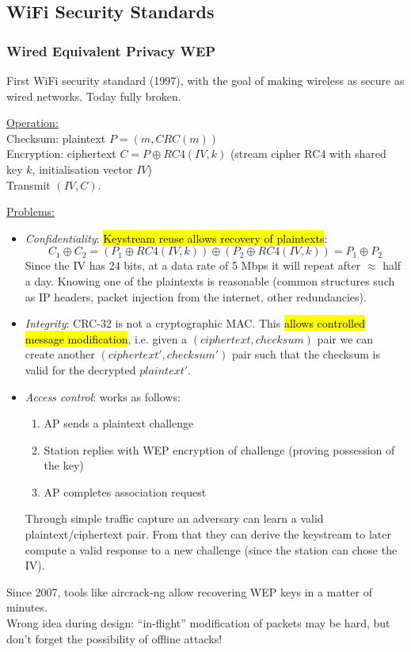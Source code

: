 \subsection{WiFi Security Standards}

\subsubsection*{Wired Equivalent Privacy WEP}

First WiFi security standard (1997), with the goal of making wireless as secure as wired networks.
Today fully broken.

\underline{Operation:}\\
Checksum: plaintext $P = (m, CRC(m))$ \\
Encryption: ciphertext $C = P \oplus RC4(IV, k)$ (stream cipher RC4 with shared key $k$, initialisation vector $IV$) \\
Transmit $(IV, C)$.

\underline{Problems:}
\begin{itemize}
	\item \textit{Confidentiality}:
	      \hl{Keystream reuse allows recovery of plaintexts}:
	      $$ C_1 \oplus C_2 = (P_1 \oplus RC4(IV,k)) \oplus (P_2 \oplus RC4(IV,k)) = P_1 \oplus P_2 $$
	      Since the IV has 24 bits, at a data rate of 5 Mbps it will repeat after $\approx$ half a day.
	      Knowing one of the plaintexts is reasonable (common structures such as IP headers, packet injection from the internet, other redundancies).
	\item \textit{Integrity}: CRC-32 is not a cryptographic MAC.
	      This \hl{allows controlled message modification}, i.e. given a $(ciphertext, checksum)$ pair we can create another $(ciphertext', checksum')$ pair such that the checksum is valid for the decrypted $plaintext'$.
	\item \textit{Access control}: works as follows:
	      \begin{enumerate}
		      \item AP sends a plaintext challenge
		      \item Station replies with WEP encryption of challenge (proving possession of the key)
		      \item AP completes association request
	      \end{enumerate}
	      Through simple traffic capture an adversary can learn a valid plaintext/ciphertext pair.
	      From that they can derive the keystream to later compute a valid response to a new challenge (since the station can chose the IV).
\end{itemize}
Since 2007, tools like aircrack-ng allow recovering WEP keys in a matter of minutes.
\\
Wrong idea during design: ``in-flight'' modification of packets may be hard, but don't forget the possibility of offline attacks!



